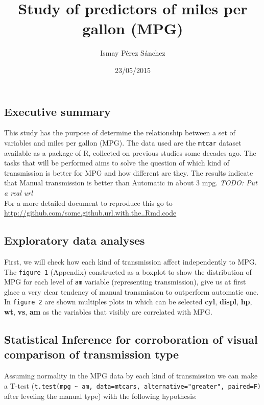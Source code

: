 \documentclass[]{article}
\title{Study of predictors of miles per gallon (MPG)}
\author{Ismay Pérez Sánchez}
\date{23/05/2015}
\begin{document}
\maketitle


\subsection{Executive summary}\label{executive-summary}

This study has the purpose of determine the relationship between a set
of variables and miles per gallon (MPG). The data used are the
\texttt{mtcar} dataset available as a package of R, collected on
previous studies some decades ago. The tasks that will be performed aims
to solve the question of which kind of transmission is better for MPG
and how different are they. The results indicate that Manual
transmission is better than Automatic in about 3 mpg. \emph{TODO: Put a
real url}\\For a more detailed document to reproduce this go to
\url{http://github.com/some.github.url.with.the..Rmd.code}

\subsection{Exploratory data analyses}\label{exploratory-data-analyses}

First, we will check how each kind of transmission affect independently
to MPG. The \texttt{figure 1} (Appendix) constructed as a boxplot to
show the distribution of MPG for each level of \texttt{am} variable
(representing transmission), give us at first glace a very clear
tendency of manual transmission to outperform automatic one. In
\texttt{figure 2} are shown multiples plots in which can be selected
\textbf{cyl}, \textbf{displ}, \textbf{hp}, \textbf{wt}, \textbf{vs},
\textbf{am} as the variables that visibly are correlated with MPG.

\subsection{Statistical Inference for corroboration of visual comparison
of transmission
type}\label{statistical-inference-for-corroboration-of-visual-comparison-of-transmission-type}

Assuming normality in the MPG data by each kind of transmission we can
make a T-test
(\texttt{t.test(mpg \textasciitilde{} am, data=mtcars, alternative="greater", paired=F)}
after leveling the manual type) with the following hypothesis:
\end{document}
